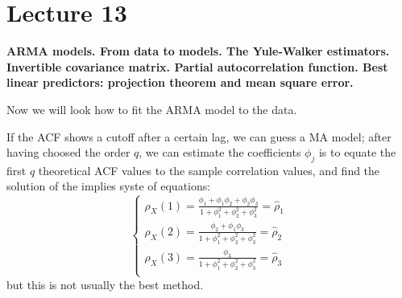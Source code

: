 \section{Lecture 13}
\label{lecture13}

\begin{center}
    \textbf{ARMA models. From data to models. The Yule-Walker estimators. Invertible covariance matrix. Partial autocorrelation function. Best linear predictors: projection theorem and mean square error.}
\end{center}

Now we will look how to fit the ARMA model to the data. 

If the ACF shows a cutoff after a certain lag, we can guess a MA model; after having choosed the order $q$, we can estimate the coefficients $\phi_j$ is to equate the first $q$ theoretical ACF values to the sample correlation values, and find the solution of the implies syste of equations:
\[
    \begin{cases}
    \rho_X(1)=\frac{\phi_1+\phi_1\phi_2+\phi_2\phi_3}{1+\phi_1^2+\phi_2^2+\phi_3^2}=\hat{\rho}_1\\
    \rho_X(2)=\frac{\phi_2+\phi_1\phi_3}{1+\phi_1^2+\phi_2^2+\phi_3^2}=\hat{\rho}_2\\
    \rho_X(3)=\frac{\phi_3}{1+\phi_1^2+\phi_2^2+\phi_3^2}=\hat{\rho}_3\\    
    \end{cases} 
\]
but this is not usually the best method.

